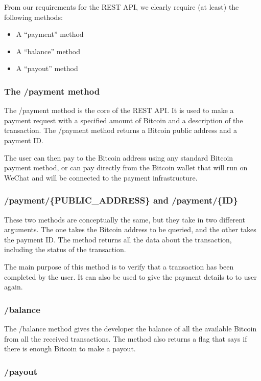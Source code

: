From our requirements for the REST API, we clearly require (at least) the following methods:

\begin{itemize}
	\item A ``payment'' method
	\item A ``balance'' method
	\item A ``payout'' method
\end{itemize}

\subsubsection{The /payment method}

The /payment method is the core of the REST API. It is used to make a payment request with a specified amount of Bitcoin and a description of the transaction. The /payment method returns a Bitcoin public address and a payment ID. 

The user can then pay to the Bitcoin address using any standard Bitcoin payment method, or can pay directly from the Bitcoin wallet that will run on WeChat and will be connected to the payment infrastructure.

\subsubsection{/payment/\{PUBLIC\_ADDRESS\} and /payment/\{ID\}}

These two methods are conceptually the same, but they take in two different arguments. The one takes the Bitcoin address to be queried, and the other takes the payment ID. The method returns all the data about the transaction, including the status of the transaction. 

The main purpose of this method is to verify that a transaction has been completed by the user. It can also be used to give the payment details to to user again.

\subsubsection{/balance}

The /balance method gives the developer the balance of all the available Bitcoin from all the received transactions. The method also returns a flag that says if there is enough Bitcoin to make a payout.

\subsubsection{/payout}

